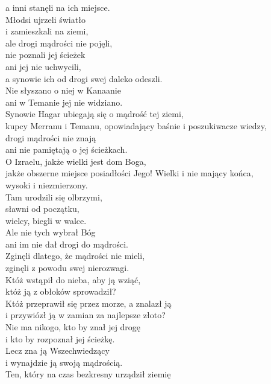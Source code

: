 \documentclass[10pt,a5paper]{book}
\begin{document}
				a inni stanęli na ich miejsce. \\
				Młodsi ujrzeli światło \\
				i zamieszkali na ziemi, \\
				ale drogi mądrości nie pojęli, \\
				nie poznali jej ścieżek \\
				ani jej nie uchwycili, \\
				a synowie ich od drogi swej daleko odeszli. \\
				Nie słyszano o niej w Kanaanie\\
				ani w Temanie jej nie widziano. \\
				Synowie Hagar ubiegają się o mądrość tej ziemi,\\
				kupcy Merranu i Temanu, opowiadający baśnie i poszukiwacze wiedzy, \\
				drogi mądrości nie znają \\
				ani nie pamiętają o jej ścieżkach. \\
				O Izraelu, jakże wielki jest dom Boga, \\
				jakże obszerne miejsce posiadłości Jego!  Wielki i nie mający końca, \\
				wysoki i niezmierzony. \\
				Tam urodzili się olbrzymi, \\
				sławni od początku, \\
				wielcy, biegli w walce. \\
				Ale nie tych wybrał Bóg \\
				ani im nie dał drogi do mądrości. \\
				Zginęli dlatego, że mądrości nie mieli, \\
				zginęli z powodu swej nierozwagi. \\
				Któż wstąpił do nieba, aby ją wziąć, \\
				któż ją z obłoków sprowadził? \\
				Któż przeprawił się przez morze, a znalazł ją \\
				i przywiózł ją w zamian za najlepsze złoto? \\
				Nie ma nikogo, kto by znał jej drogę \\
				i kto by rozpoznał jej ścieżkę. \\
				Lecz zna ją Wszechwiedzący \\
				i wynajdzie ją swoją mądrością. \\
				Ten, który na czas bezkresny urządził ziemię \\
\end{document}
